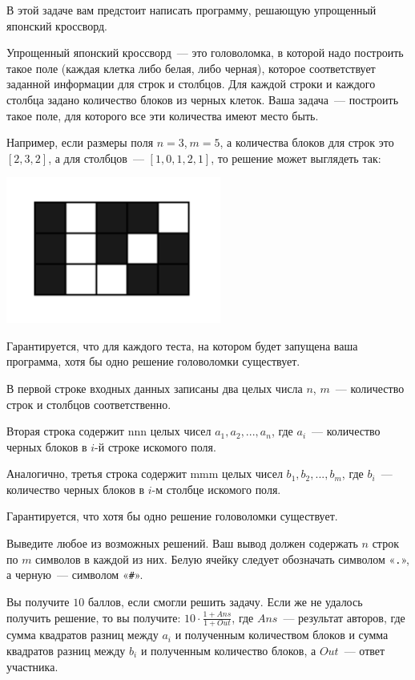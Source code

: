
В этой задаче вам предстоит написать программу, решающую упрощенный японский кроссворд.

Упрощенный японский кроссворд~--- это головоломка, в которой надо построить такое поле
(каждая клетка либо белая, либо черная), которое соответствует заданной информации для строк и столбцов.
Для каждой строки и каждого столбца задано количество блоков из черных клеток.
Ваша задача~--- построить такое поле, для которого все эти количества имеют место быть.

Например, если размеры поля $n = 3$, $m = 5$, а количества блоков для строк это $[2, 3, 2]$, а для столбцов~--- $[1, 0, 1, 2, 1]$, то решение может выглядеть так:

\begin{center}
	\includegraphics[width=200pt,natwidth=680,natheight=544]{tasks/crossword/statements/images/crossword.png}
\end{center}

Гарантируется, что для каждого теста, на котором будет запущена ваша программа, хотя бы одно решение головоломки существует.

\Input
В первой строке входных данных записаны два целых числа $n$, $m$~--- количество строк и столбцов соответственно.

Вторая строка содержит nnn целых чисел $a_1, a_2, ..., a_n$​, где $a_i$​~--- количество черных блоков в $i$-й строке искомого поля.

Аналогично, третья строка содержит mmm целых чисел $b_1, b_2, ..., b_m$​, где $b_i$​~--- количество черных блоков в $i$-м столбце искомого поля.

Гарантируется, что хотя бы одно решение головоломки существует.

\Output
Выведите любое из возможных решений. Ваш вывод должен содержать $n$ строк по $m$ символов в каждой из них.
Белую ячейку следует обозначать символом «\texttt{.}», а черную~--- символом «\texttt{#}».

\Samples
\BeginTests
\EndTests

\Scoring
Вы получите $10$ баллов, если смогли решить задачу. Если же не удалось получить решение, то вы получите: $10 \cdot \frac{1 + Ans}{1 + Out}$, где $Ans$~---
результат авторов, где сумма квадратов разниц между $a_i$ и полученным количеством блоков и сумма квадратов разниц между $b_i$ и полученным количество блоков,
а $Out$~--- ответ участника.

\EndProblem
